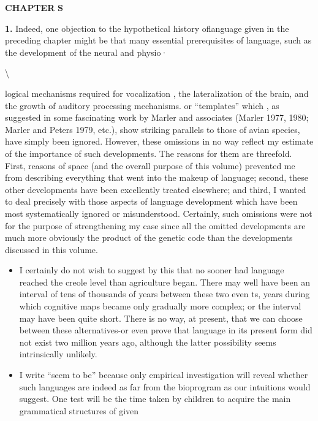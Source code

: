 \begin{itemize}
\begin{itemize}
\begin{itemize}
\begin{itemize}
\textbf{CHAPTER} \textbf{S}

\textbf{1.} Indeed, one objection to the hypothetical history oflanguage given in the preceding chapter might be that many essential prerequi\-sites of language, such as the development of the neural and physio·

{\textbackslash}


logical mechanisms required for vocalization , the lateralization of the brain, and the growth of auditory processing mechanisms. or ``tem\-plates'' which , as suggested in some fascinating work by Marler and associates (Marler 1977, 1980; Marler and Peters 1979, etc.), show striking parallels to those of avian species, have simply been ignored. However, these omissions in no way reflect my estimate of the impor\-tance of such developments. The reasons for them are threefold. First, reasons of space (and the overall purpose of this volume) pre\-vented me from describing everything that went into the makeup of language; second, these other developments have been excellently treated elsewhere; and third, I wanted to deal precisely with those aspects of language development which have been most systematically ignored or misunderstood. Certainly, such omissions were not for the purpose of strengthening my case since all the omitted developments are much more obviously the product of the genetic code than the developments discussed in this volume.

\begin{itemize}
\item I certainly do not wish to suggest by this that no sooner had language reached the creole level than agriculture began. There may well have been an interval of tens of thousands of years between these two even ts, years during which cognitive maps became only gradually more complex; or the interval may have been quite short. There is no way, at present, that we can choose between these alternatives-or even prove that language in its present form did not exist two million years ago, although the latter possibility seems intrinsically unlikely.
\item I write ``seem to be'' because only empirical investigation will reveal whether such languages are indeed as far from the bio\-program as our intuitions would suggest. One test will be the time taken by children to acquire the main grammatical structures of given
\end{itemize}


\end{itemize}
\end{itemize}
\end{itemize}
\end{itemize}
